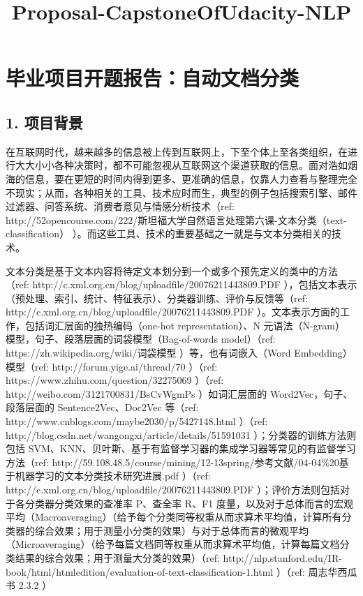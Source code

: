 \documentclass[11pt]{article}
\title{Proposal-CapstoneOfUdacity-NLP}
\begin{document}
    
    
    \maketitle
    
    

    
    \section{毕业项目开题报告：自动文档分类}\label{ux6bd5ux4e1aux9879ux76eeux5f00ux9898ux62a5ux544aux81eaux52a8ux6587ux6863ux5206ux7c7b}

    \subsection{1. 项目背景}\label{ux9879ux76eeux80ccux666f}

在互联网时代，越来越多的信息被上传到互联网上，下至个体上至各类组织，在进行大大小小各种决策时，都不可能忽视从互联网这个渠道获取的信息。面对浩如烟海的信息，要在更短的时间内得到更多、更准确的信息，仅靠人力查看与整理完全不现实；从而，各种相关的工具、技术应时而生，典型的例子包括搜索引擎、邮件过滤器、问答系统、消费者意见与情感分析技术（ref:
http://52opencourse.com/222/斯坦福大学自然语言处理第六课-文本分类（text-classification）
）。而这些工具、技术的重要基础之一就是与文本分类相关的技术。

文本分类是基于文本内容将待定文本划分到一个或多个预先定义的类中的方法（ref:
http://c.xml.org.cn/blog/uploadfile/20076211443809.PDF
），包括文本表示（预处理、索引、统计、特征表示）、分类器训练、评价与反馈等（ref:
http://c.xml.org.cn/blog/uploadfile/20076211443809.PDF
）。文本表示方面的工作，包括词汇层面的独热编码（one-hot
representation）、N 元语法（N-gram）
模型，句子、段落层面的词袋模型（Bag-of-words model）（ref:
https://zh.wikipedia.org/wiki/词袋模型 ）等，也有词嵌入（Word
Embedding）模型（ref: http://forum.yige.ai/thread/70 ）（ref:
https://www.zhihu.com/question/32275069 ）（ref:
http://weibo.com/3121700831/BsCvWgmPs ）如词汇层面的
Word2Vec，句子、段落层面的 Sentence2Vec、Doc2Vec 等（ref:
http://www.cnblogs.com/maybe2030/p/5427148.html ）（ref:
http://blog.csdn.net/wangongxi/article/details/51591031
）；分类器的训练方法则包括
SVM、KNN、贝叶斯、基于有监督学习器的集成学习器等常见的有监督学习方法（ref:
http://59.108.48.5/course/mining/12-13spring/参考文献/04-04\%20基于机器学习的文本分类技术研究进展.pdf
）（ref: http://c.xml.org.cn/blog/uploadfile/20076211443809.PDF
）；评价方法则包括对于各分类器分类效果的查准率 P、查全率 R、F1
度量，以及对于总体而言的宏观平均（Macroaveraging）（给予每个分类同等权重从而求算术平均值，计算所有分类器的综合效果；用于测量小分类的效果）与对于总体而言的微观平均（Microaveraging）（给予每篇文档同等权重从而求算术平均值，计算每篇文档分类结果的综合效果；用于测量大分类的效果）（ref:
http://nlp.stanford.edu/IR-book/html/htmledition/evaluation-of-text-classification-1.html
）（ref: 周志华西瓜书 2.3.2 ）
\end{document}
